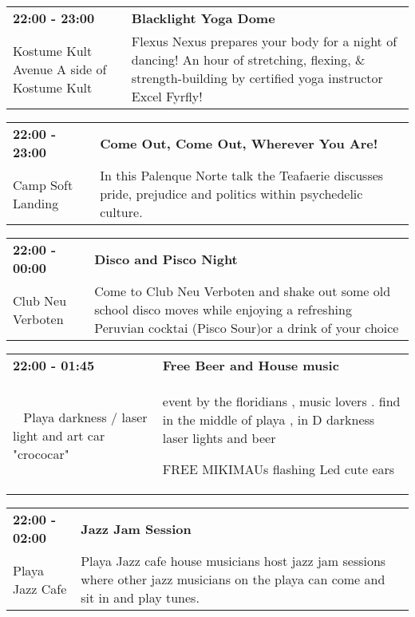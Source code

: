 \begin{tabular}{ p{1in} p{2.2in} }
    \textbf{22:00 - 23:00} & \textbf{Blacklight Yoga Dome} \\
    Kostume Kult \newline Avenue A side of Kostume Kult & Flexus Nexus prepares your body for a night of dancing! An hour of stretching, flexing, \& strength-building by certified yoga instructor Excel Fyrfly! \\
    \hline 
\end{tabular}
    
\begin{tabular}{ p{1in} p{2.2in} }
    \textbf{22:00 - 23:00} & \textbf{Come Out, Come Out, Wherever You Are!} \\
    Camp Soft Landing \newline  & In this Palenque Norte talk the Teafaerie discusses pride, prejudice and politics within psychedelic culture. \\
    \hline 
\end{tabular}
    
\begin{tabular}{ p{1in} p{2.2in} }
    \textbf{22:00 - 00:00} & \textbf{Disco and Pisco Night} \\
    Club Neu Verboten \newline  & Come to Club Neu Verboten and shake out some old school disco moves while enjoying a refreshing Peruvian cocktai (Pisco Sour)or a drink of your choice \\
    \hline 
\end{tabular}
    
\begin{tabular}{ p{1in} p{2.2in} }
    \textbf{22:00 - 01:45} & \textbf{Free Beer and House music} \\
    ~ \newline Playa darkness / laser light and art car "crococar" & event by the floridians
, music lovers . find in the middle of playa , in D darkness laser lights and beer

FREE MIKIMAUs flashing Led cute ears \\
    \hline 
\end{tabular}
    
\begin{tabular}{ p{1in} p{2.2in} }
    \textbf{22:00 - 02:00} & \textbf{Jazz Jam Session} \\
    Playa Jazz Cafe \newline  & Playa Jazz cafe house musicians host jazz jam sessions where other jazz musicians on the playa can come and sit in and play tunes. \\
    \hline 
\end{tabular}
    
